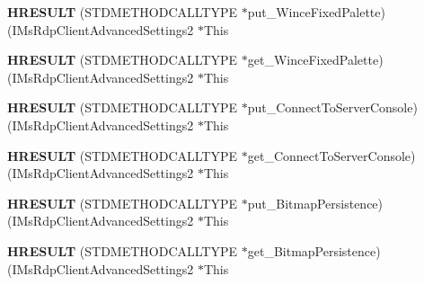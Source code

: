 \begin{DoxyCompactItemize}
\item 
\mbox{\label{struct_i_ms_rdp_client_advanced_settings2_vtbl_ad6ef3ca8d4481be94b7eb0ce1689ac35}} 
{\bfseries H\+R\+E\+S\+U\+LT} (S\+T\+D\+M\+E\+T\+H\+O\+D\+C\+A\+L\+L\+T\+Y\+PE $\ast$put\+\_\+\+Wince\+Fixed\+Palette)(I\+Ms\+Rdp\+Client\+Advanced\+Settings2 $\ast$This
\item 
\mbox{\label{struct_i_ms_rdp_client_advanced_settings2_vtbl_a03c4cce931f9e7d6b964bb9d7e91169d}} 
{\bfseries H\+R\+E\+S\+U\+LT} (S\+T\+D\+M\+E\+T\+H\+O\+D\+C\+A\+L\+L\+T\+Y\+PE $\ast$get\+\_\+\+Wince\+Fixed\+Palette)(I\+Ms\+Rdp\+Client\+Advanced\+Settings2 $\ast$This
\item 
\mbox{\label{struct_i_ms_rdp_client_advanced_settings2_vtbl_aee5d4e6a9c5d69d2ad12114056fc3375}} 
{\bfseries H\+R\+E\+S\+U\+LT} (S\+T\+D\+M\+E\+T\+H\+O\+D\+C\+A\+L\+L\+T\+Y\+PE $\ast$put\+\_\+\+Connect\+To\+Server\+Console)(I\+Ms\+Rdp\+Client\+Advanced\+Settings2 $\ast$This
\item 
\mbox{\label{struct_i_ms_rdp_client_advanced_settings2_vtbl_a223d661d7ca4cb3c53db11a7f3ecde60}} 
{\bfseries H\+R\+E\+S\+U\+LT} (S\+T\+D\+M\+E\+T\+H\+O\+D\+C\+A\+L\+L\+T\+Y\+PE $\ast$get\+\_\+\+Connect\+To\+Server\+Console)(I\+Ms\+Rdp\+Client\+Advanced\+Settings2 $\ast$This
\item 
\mbox{\label{struct_i_ms_rdp_client_advanced_settings2_vtbl_a0799570ac57c430d4debcbc703f78730}} 
{\bfseries H\+R\+E\+S\+U\+LT} (S\+T\+D\+M\+E\+T\+H\+O\+D\+C\+A\+L\+L\+T\+Y\+PE $\ast$put\+\_\+\+Bitmap\+Persistence)(I\+Ms\+Rdp\+Client\+Advanced\+Settings2 $\ast$This
\item 
\mbox{\label{struct_i_ms_rdp_client_advanced_settings2_vtbl_a774ac7222c7cebf8fce557fcf1fda8c1}} 
{\bfseries H\+R\+E\+S\+U\+LT} (S\+T\+D\+M\+E\+T\+H\+O\+D\+C\+A\+L\+L\+T\+Y\+PE $\ast$get\+\_\+\+Bitmap\+Persistence)(I\+Ms\+Rdp\+Client\+Advanced\+Settings2 $\ast$This
\item 
\mbox{\label{struct_i_ms_rdp_client_advanced_settings2_vtbl_a0a535a9d50134c5c5abf34c39a48538b}} 

\end{DoxyCompactItemize}
